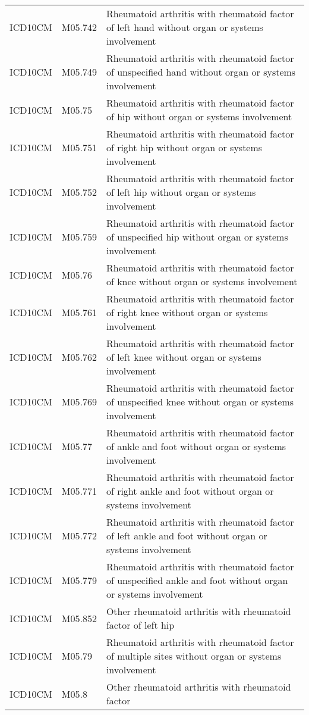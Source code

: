\begin{table}[ht]
\begin{tabular}{lll}
  ICD10CM & M05.742 & Rheumatoid arthritis with rheumatoid factor of left hand without organ or systems involvement \\ 
  ICD10CM & M05.749 & Rheumatoid arthritis with rheumatoid factor of unspecified hand without organ or systems involvement \\ 
  ICD10CM & M05.75 & Rheumatoid arthritis with rheumatoid factor of hip without organ or systems involvement \\ 
  ICD10CM & M05.751 & Rheumatoid arthritis with rheumatoid factor of right hip without organ or systems involvement \\ 
  ICD10CM & M05.752 & Rheumatoid arthritis with rheumatoid factor of left hip without organ or systems involvement \\ 
  ICD10CM & M05.759 & Rheumatoid arthritis with rheumatoid factor of unspecified hip without organ or systems involvement \\ 
  ICD10CM & M05.76 & Rheumatoid arthritis with rheumatoid factor of knee without organ or systems involvement \\ 
  ICD10CM & M05.761 & Rheumatoid arthritis with rheumatoid factor of right knee without organ or systems involvement \\ 
  ICD10CM & M05.762 & Rheumatoid arthritis with rheumatoid factor of left knee without organ or systems involvement \\ 
  ICD10CM & M05.769 & Rheumatoid arthritis with rheumatoid factor of unspecified knee without organ or systems involvement \\ 
  ICD10CM & M05.77 & Rheumatoid arthritis with rheumatoid factor of ankle and foot without organ or systems involvement \\ 
  ICD10CM & M05.771 & Rheumatoid arthritis with rheumatoid factor of right ankle and foot without organ or systems involvement \\ 
  ICD10CM & M05.772 & Rheumatoid arthritis with rheumatoid factor of left ankle and foot without organ or systems involvement \\ 
  ICD10CM & M05.779 & Rheumatoid arthritis with rheumatoid factor of unspecified ankle and foot without organ or systems involvement \\ 
  ICD10CM & M05.852 & Other rheumatoid arthritis with rheumatoid factor of left hip \\ 
  ICD10CM & M05.79 & Rheumatoid arthritis with rheumatoid factor of multiple sites without organ or systems involvement \\ 
  ICD10CM & M05.8 & Other rheumatoid arthritis with rheumatoid factor \\ 

\end{tabular}
\end{table}
